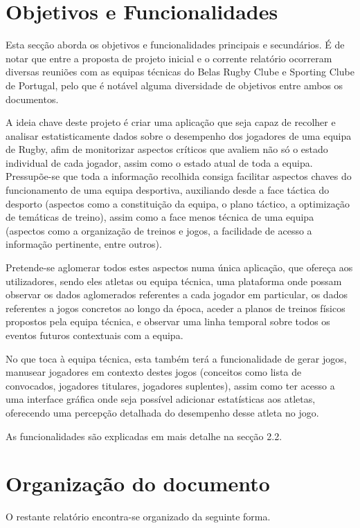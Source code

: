 

%
%
\section{Objetivos e Funcionalidades} \label{sec12} 

Esta secção aborda os objetivos e funcionalidades principais e secundários. É de notar que entre a proposta de projeto inicial e o corrente relatório ocorreram diversas reuniões com as equipas técnicas do Belas Rugby Clube e Sporting Clube de Portugal, pelo que é notável alguma diversidade de objetivos entre ambos os documentos.

A ideia chave deste projeto é criar uma aplicação que seja capaz de recolher e analisar estatisticamente dados sobre o desempenho dos jogadores de uma equipa de Rugby, afim de monitorizar aspectos críticos que avaliem não só o estado individual de cada jogador, assim como o estado atual de toda a equipa. Pressupõe-se que toda a informação recolhida consiga facilitar aspectos chaves do funcionamento de uma equipa desportiva, auxiliando desde a face táctica do desporto (aspectos como a constituição da equipa, o plano táctico, a optimização de temáticas de treino), assim como a face menos técnica de uma equipa (aspectos como a organização de treinos e jogos, a facilidade de acesso a informação pertinente, entre outros).

Pretende-se aglomerar todos estes aspectos numa única aplicação, que ofereça aos utilizadores, sendo eles atletas ou equipa técnica, uma plataforma onde possam observar os dados aglomerados referentes a cada jogador em particular, os dados referentes a jogos concretos ao longo da época, aceder a planos de treinos físicos propostos pela equipa técnica, e observar uma linha temporal sobre todos os eventos futuros contextuais com a equipa.

No que toca à equipa técnica, esta também terá a funcionalidade de gerar jogos, manusear jogadores em contexto destes jogos (conceitos como lista de convocados, jogadores titulares, jogadores suplentes), assim como ter acesso a uma interface gráfica onde seja possível adicionar estatísticas aos atletas, oferecendo uma percepção detalhada do desempenho desse atleta no jogo.

As funcionalidades são explicadas em mais detalhe na secção 2.2.
\section{Organização do documento} \label{sec13}
O restante relatório encontra-se organizado da seguinte forma.\\

